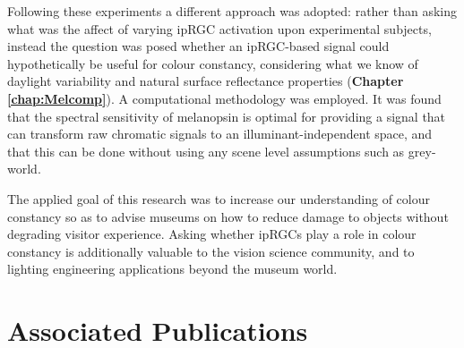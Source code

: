 Following these experiments a different approach was adopted: rather than asking what was the affect of varying \gls{ipRGC} activation upon experimental subjects, instead the question was posed whether an \gls{ipRGC}-based signal could hypothetically be useful for colour constancy, considering what we know of daylight variability and natural surface reflectance properties (\textbf{Chapter \ref{chap:Melcomp}}). A computational methodology was employed. It was found that the spectral sensitivity of melanopsin is optimal for providing a signal that can transform raw chromatic signals to an illuminant-independent space, and that this can be done without using any scene level assumptions such as grey-world.

The applied goal of this research was to increase our understanding of colour constancy so as to advise museums on how to reduce damage to objects without degrading visitor experience. Asking whether \glspl{ipRGC} play a role in colour constancy is additionally valuable to the vision science community, and to lighting engineering applications beyond the museum world.

\section{Associated Publications}


